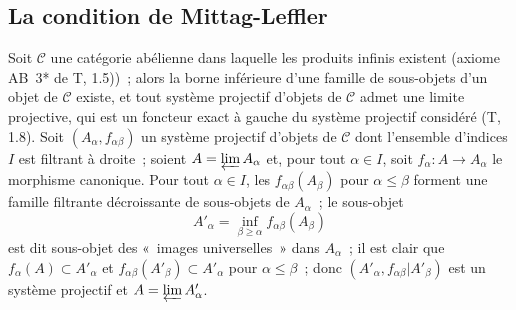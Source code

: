 \subsection{La condition de Mittag-Leffler}
\label{subsection:0.13.1-fr}

\begin{env}[13.1.1]
\label{0.13.1.1-fr}
Soit $\mathcal C$ une catégorie abélienne dans laquelle les produits infinis
existent (axiome AB~3* de T, 1.5))~; alors la borne inférieure d'une famille
de sous-objets d'un objet de $\mathcal C$ existe, et tout système projectif
d'objets de $\mathcal C$ admet une limite projective, qui est un foncteur
exact à gauche du système projectif considéré (T, 1.8). Soit
$(A_\alpha,f_{\alpha\beta})$
un système projectif d'objets de $\mathcal C$ dont l'ensemble d'indices $I$
est filtrant à droite~; soient $A=\varprojlim A_\alpha$ et, pour tout
$\alpha\in I$, soit $f_\alpha:A\to A_\alpha$ le morphisme canonique. Pour
tout $\alpha\in I$, les $f_{\alpha\beta}(A_\beta)$ pour
$\alpha\leq\beta$ forment une famille filtrante décroissante de sous-objets
de $A_\alpha$~; le sous-objet
\[
A'_\alpha=\inf_{\beta\geq\alpha}f_{\alpha\beta}(A_\beta)
\]
est dit sous-objet des «~images universelles~» dans $A_\alpha$~; il est
clair que $f_\alpha(A)\subset A'_\alpha$ et
$f_{\alpha\beta}(A'_\beta)\subset A'_\alpha$ pour
$\alpha\leq\beta$~; donc
$(A'_\alpha,f_{\alpha\beta}|A'_\beta)$ est un système projectif et
$A=\varprojlim A'_\alpha$.
\end{env}

